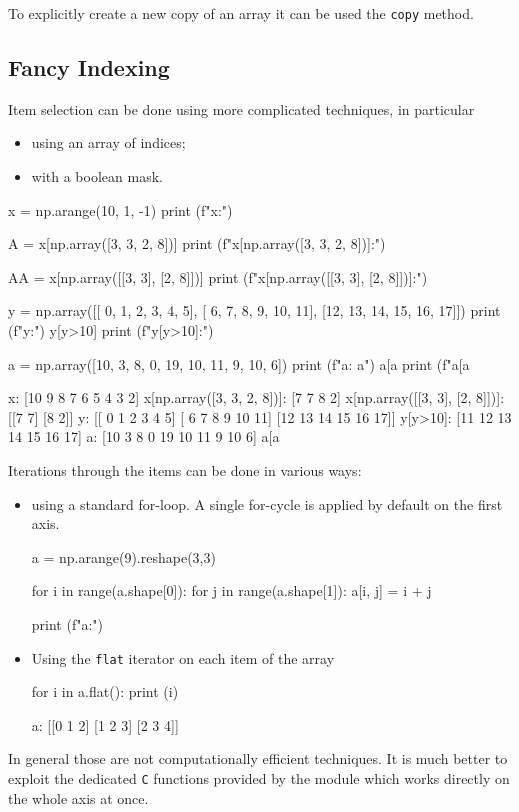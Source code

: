 To explicitly create a new copy of an array it can be used the \texttt{copy} method.

\subsection{Fancy Indexing}

Item selection can be done using more complicated techniques, in particular
\begin{itemize}
\item using an array of indices;
\item with a boolean mask.
\end{itemize}

\begin{ipythonnon}
x = np.arange(10, 1, -1)
print (f"x:")

A = x[np.array([3, 3, 2, 8])]
print (f"x[np.array([3, 3, 2, 8])]:")

AA = x[np.array([[3, 3], [2, 8]])]
print (f"x[np.array([[3, 3], [2, 8]])]:")

y = np.array([[ 0, 1, 2, 3, 4, 5],
              [ 6, 7, 8, 9, 10, 11],
              [12, 13, 14, 15, 16, 17]])
print (f"y:")
y[y>10]
print (f"y[y>10]:")

a = np.array([10, 3, 8, 0, 19, 10, 11, 9, 10, 6])
print (f"a: {a}")
a[a %
print (f"a[a %
\end{ipythonnon}
\begin{ioutput}
x:
[10  9  8  7  6  5  4  3  2]
x[np.array([3, 3, 2, 8])]:
[7 7 8 2]
x[np.array([[3, 3], [2, 8]])]:
[[7 7]
 [8 2]]
y:
[[ 0  1  2  3  4  5]
 [ 6  7  8  9 10 11]
 [12 13 14 15 16 17]]
y[y>10]:
[11 12 13 14 15 16 17]
a: [10  3  8  0 19 10 11  9 10  6]
a[a %
\end{ioutput}

Iterations through the items can be done in various ways:
\begin{itemize}
\item using a standard for-loop. A single for-cycle is applied by default on the first axis.
\begin{ipythonnon}
a = np.arange(9).reshape(3,3)

for i in range(a.shape[0]):
  for j in range(a.shape[1]):
    a[i, j] = i + j

print (f"a:")
\end{ipythonnon}
\item Using the \texttt{flat} iterator on each item of the array
\begin{ipythonnon}
for i in a.flat():
  print (i)
\end{ipythonnon}
\begin{ioutput}
a:
[[0 1 2]
 [1 2 3]
 [2 3 4]]
\end{ioutput}
\end{itemize}
In general those are not computationally efficient techniques. It is much better to exploit the dedicated \texttt{C} functions provided by the module which works directly on the whole axis at once.

